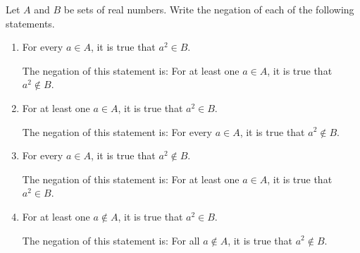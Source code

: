 \documentclass[12pt]{article}
\begin{document}
 Let $A$ and $B$ be sets of real numbers. Write the negation of each of the 
following statements.
\begin{enumerate}[label=(\alph*)]
	\item For every $a \in A$, it is true that $a^2 \in B$.
	
	The negation of this statement is: For at least one $a \in A$, it is true 
	that $a^2 \notin B$.
	\item For at least one $a \in A$, it is true that $a^2 \in B$.
	
	The negation of this statement is: For every $a \in A$, it is true that $a^2 \notin B$.
	\item For every $a \in A$, it is true that $a^2 \notin B$. 
	
	The negation of this statement is: For at least one $a \in A$, it is true that
	$a^2 \in B$.
	\item For at least one $a \notin A$, it is true that $a^2 \in B$.
	
	The negation of this statement is: For all $a \notin A$, it is true that 
	$a^2 \notin B$.
\end{enumerate}
\end{document}
